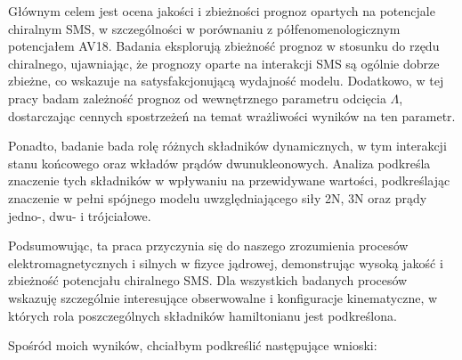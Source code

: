 \documentclass[a4paper, 14pt]{extarticle}
\begin{document}
G\l{}\'ownym celem jest ocena jakości i zbie\.zności prognoz opartych na potencjale chiralnym SMS, w szczeg\'olności w por\'ownaniu z p\'o\l{}fenomenologicznym potencja\l{}em AV18. Badania eksploruj\k{a} zbie\.znoś\'c prognoz w stosunku do rz\k{e}du chiralnego, ujawniaj\k{a}c, \.ze prognozy oparte na interakcji SMS s\k{a} og\'olnie dobrze zbie\.zne, co wskazuje na satysfakcjonuj\k{a}c\k{a} wydajnoś\'c modelu. Dodatkowo, w tej pracy badam zale\.znoś\'c prognoz od wewn\k{e}trznego parametru odci\k{e}cia $\Lambda$, dostarczaj\k{a}c cennych spostrze\.zeń na temat wra\.zliwości wynik\'ow na ten parametr.

Ponadto, badanie bada rol\k{e} r\'o\.znych sk\l{}adnik\'ow dynamicznych, w tym interakcji stanu końcowego oraz wk\l{}ad\'ow pr\k{a}d\'ow dwunukleonowych. Analiza podkreśla znaczenie tych sk\l{}adnik\'ow w wp\l{}ywaniu na przewidywane wartości, podkreślaj\k{a}c znaczenie w pe\l{}ni sp\'ojnego modelu uwzgl\k{e}dniaj\k{a}cego si\l{}y 2N, 3N oraz pr\k{a}dy jedno-, dwu- i tr\'ojcia\l{}owe.

Podsumowuj\k{a}c, ta praca przyczynia si\k{e} do naszego zrozumienia proces\'ow elektromagnetycznych i silnych w fizyce j\k{a}drowej, demonstruj\k{a}c wysok\k{a} jakoś\'c i zbie\.znoś\'c potencja\l{}u chiralnego SMS.
Dla wszystkich badanych proces\'ow wskazuj\k{e} szczeg\'olnie interesuj\k{a}ce obserwowalne i konfiguracje kinematyczne, w kt\'orych rola poszczeg\'olnych sk\l{}adnik\'ow hamiltonianu jest podkreślona.

Spośr\'od moich wynik\'ow, chcia\l{}bym podkreśli\'c nast\k{e}puj\k{a}ce wnioski:
\end{document}
